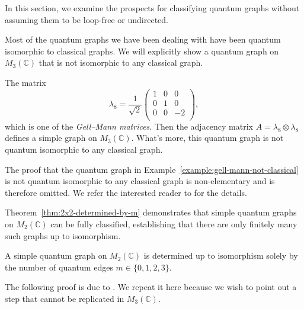 In this section, we examine the prospects for classifying quantum
graphs without assuming them to be loop-free or undirected.

Most of the quantum graphs we have been dealing with have been
quantum isomorphic to classical graphs. We will explicitly show a
quantum graph on \( M_{3}(\mathbb{C}) \) that is not isomorphic to
any classical graph.

\begin{example}
    \label{example:gell-mann-not-classical}
    The matrix
    \[
        \lambda_{8} = \frac{1}{\sqrt{2}}
        \begin{pmatrix}
            1 & 0 & 0 \\
            0 & 1 & 0 \\
            0 & 0 & -2 \\
        \end{pmatrix},
    \]
    which is one of the \emph{Gell--Mann matrices}. Then
    the adjacency matrix \( A = \lambda_{8} \otimes \lambda_{8}
    \) defines a simple graph on \( M_{3}(\mathbb{C}) \). What's more,
    this quantum graph is not quantum isomorphic to any classical graph.
\end{example}

The proof that the quantum graph in
Example~\ref{example:gell-mann-not-classical} is not quantum
isomorphic to any classical graph is non-elementary and is therefore
omitted. We refer the interested reader to \textcite{gromada22} for the details.

Theorem~\ref{thm:2x2-determined-by-m} demonstrates that simple
quantum graphs on \( M_2(\mathbb{C}) \) can be fully classified, establishing
that there are only finitely many such graphs up to isomorphism.

\begin{theorem}
    \label{thm:2x2-determined-by-m}
    A simple quantum graph on \( M_2(\mathbb{C}) \) is determined up to
    isomorphism solely by
    the number of quantum edges \( m \in \{0,1,2,3\} \).
\end{theorem}

The following proof is due to \textcite{gromada22}. We repeat it here
because we wish to point out a step that cannot be replicated in
\( M_3 (\mathbb{C}) \).

